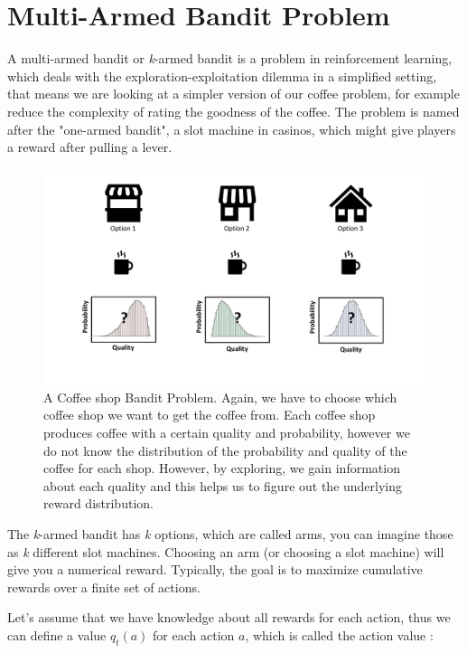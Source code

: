 \section{Multi-Armed Bandit Problem}
A multi-armed bandit or \textit{k}-armed bandit is a problem in reinforcement learning, which deals with the exploration-exploitation dilemma in a simplified setting, that means we are looking at a simpler version of our coffee problem, for example reduce the complexity of rating the goodness of the coffee.
The problem is named after the "one-armed bandit", a slot machine in casinos, which might give players a reward after pulling a lever.
\begin{figure}
    \centering
    \includegraphics[width=1\textwidth]{Plots/FinalCoffePlot.pdf}
    \vspace{-1.5cm}
    \caption[Bandit Coffee Shop]{A Coffee shop Bandit Problem. Again, we have to choose which coffee shop we want to get the coffee from. Each coffee shop produces coffee with a certain quality and probability, however we do not know the distribution of the probability and quality of the coffee for each shop. However, by exploring, we gain information about each quality and this helps us to figure out the underlying reward distribution. }
    
    \label{fig:CoffeBandit}
\end{figure}{}
The \textit{k}-armed bandit has \textit{k} options, which are called arms, you can imagine those as \textit{k} different slot machines. Choosing an arm (or choosing a slot machine) will give you a numerical reward. 
Typically, the goal is to maximize cumulative rewards over a finite set of actions.

Let's assume that we have knowledge about all rewards for each action, thus we can define a value $q_t(a)$ for each action $a$, which is called the action value \citep{sutton2018reinforcement}: 

